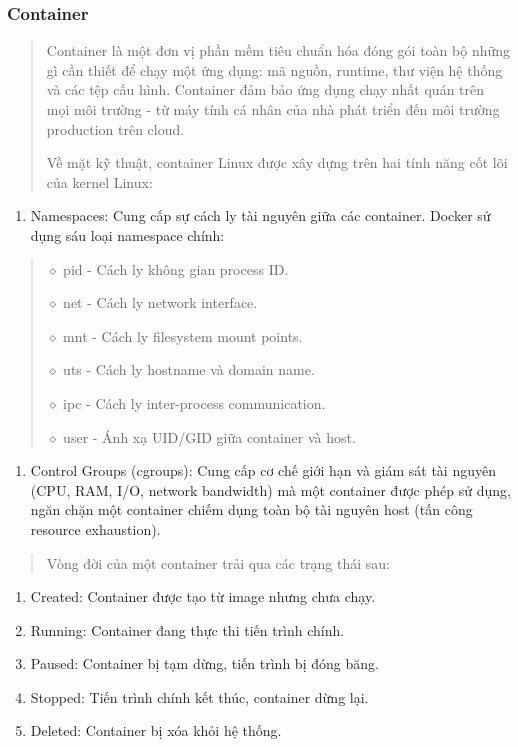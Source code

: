 \subsubsection{Container}\label{container}

\begin{quote}
Container là một đơn vị phần mềm tiêu chuẩn hóa đóng gói toàn bộ những gì cần thiết để chạy một ứng dụng: mã nguồn, runtime, thư viện hệ thống và các tệp cấu hình. Container đảm bảo ứng dụng chạy nhất quán trên mọi môi trường - từ máy tính cá nhân của nhà phát triển đến môi trường production trên cloud.

Về mặt kỹ thuật, container Linux được xây dựng trên hai tính năng cốt lõi của kernel Linux:
\end{quote}

\begin{enumerate}
\def\labelenumi{(\arabic{enumi})}
\item
  Namespaces: Cung cấp sự cách ly tài nguyên giữa các container. Docker sử dụng sáu loại namespace chính:
\end{enumerate}

\begin{quote}
\(\diamond\) pid - Cách ly không gian process ID.

\(\diamond\) net - Cách ly network interface.

\(\diamond\) mnt - Cách ly filesystem mount points.

\(\diamond\) uts - Cách ly hostname và domain name.

\(\diamond\) ipc - Cách ly inter-process communication.

\(\diamond\) user - Ánh xạ UID/GID giữa container và host.
\end{quote}

\begin{enumerate}
\def\labelenumi{(\arabic{enumi})}
\setcounter{enumi}{1}
\item
  Control Groups (cgroups): Cung cấp cơ chế giới hạn và giám sát tài nguyên (CPU, RAM, I/O, network bandwidth) mà một container được phép sử dụng, ngăn chặn một container chiếm dụng toàn bộ tài nguyên host (tấn công resource exhaustion).
\end{enumerate}

\begin{quote}
Vòng đời của một container trải qua các trạng thái sau:
\end{quote}

\begin{enumerate}
\def\labelenumi{\arabic{enumi}.}
\item
  Created: Container được tạo từ image nhưng chưa chạy.
\item
  Running: Container đang thực thi tiến trình chính.
\item
  Paused: Container bị tạm dừng, tiến trình bị đóng băng.
\item
  Stopped: Tiến trình chính kết thúc, container dừng lại.
\item
  Deleted: Container bị xóa khỏi hệ thống.
\end{enumerate}

